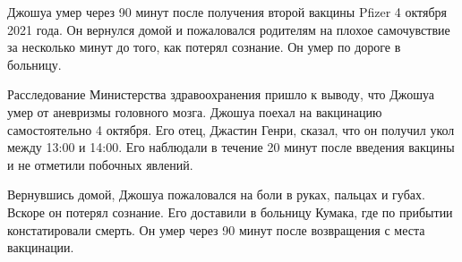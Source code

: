 Джошуа умер через 90 минут после получения второй вакцины Pfizer 4 октября 2021
года. Он вернулся домой и пожаловался родителям на плохое самочувствие за
несколько минут до того, как потерял сознание. Он умер по дороге в больницу.

Расследование Министерства здравоохранения пришло к выводу, что Джошуа умер от
аневризмы головного мозга. Джошуа поехал на вакцинацию самостоятельно 4
октября. Его отец, Джастин Генри, сказал, что он получил укол между 13:00 и
14:00. Его наблюдали в течение 20 минут после введения вакцины и не отметили
побочных явлений.

Вернувшись домой, Джошуа пожаловался на боли в руках, пальцах и губах. Вскоре он
потерял сознание. Его доставили в больницу Кумака, где по прибытии
констатировали смерть. Он умер через 90 минут после возвращения с места
вакцинации.
